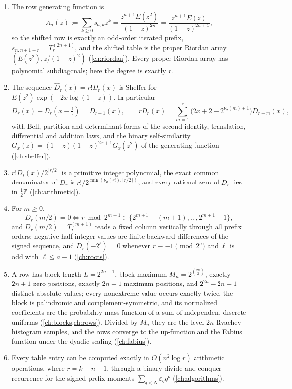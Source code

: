 \documentclass[11pt,a4paper,oneside,openany]{book}
\numberwithin{equation}{chapter}
\theoremstyle{definition}
\theoremstyle{remark}
\newcommand{\Z}{\mathbb Z}
\newcommand{\eps}{\varepsilon}
\newcommand{\nuTwo}{\nu_2}
\newcommand{\Diag}{D}
\newcommand{\Prefix}{T}
\begin{document}
\begin{enumerate}
\item The row generating function is
\[
 A_n(z):=\sum_{k\ge0}s_{n,k}z^k
 =\frac{z^{n+1}E(z^2)}{(1-z)^{2n}}
 =\frac{z^{n+1}E(z)}{(1-z)^{2n+1}},
\]
so the shifted row is exactly an odd-order iterated prefix,
$s_{n,n+1+r}=\Prefix_r^{(2n+1)}$, and the shifted table is the proper Riordan
array $(E(z^2),z/(1-z)^2)$ (\cref{ch:riordan}). Every proper Riordan array
has polynomial subdiagonals; here the degree is exactly $r$.

\item The sequence $\widehat\Diag_r(x)=r!\Diag_r(x)$ is Sheffer for
$E(z^2)\exp(-2x\log(1-z))$. In particular
\[
 \Diag_r(x)-\Diag_r(x-\tfrac12)=\Diag_{r-1}(x),
 \qquad
 r\Diag_r(x)=\sum_{m=1}^r\bigl(2x+2-2^{\nuTwo(m)+1}\bigr)\Diag_{r-m}(x),
\]
with Bell, partition and determinant forms of the second identity,
translation, differential and addition laws, and the binary self-similarity
$G_x(z)=(1-z)(1+z)^{2x+1}G_x(z^2)$ of the generating function
(\cref{ch:sheffer}).

\item $r!\Diag_r(x)/2^{\lceil r/2\rceil}$ is a primitive integer polynomial,
the exact common denominator of $\Diag_r$ is
$r!/2^{\min(\nuTwo(r!),\lceil r/2\rceil)}$, and every rational zero of
$\Diag_r$ lies in $\tfrac12\Z$ (\cref{ch:arithmetic}).

\item For $m\ge0$,
\[
 \Diag_r(m/2)=0
 \iff
 r\bmod 2^{m+1}\in\{2^{m+1}-(m+1),\ldots,2^{m+1}-1\},
\]
and $\Diag_r(m/2)=\Prefix_r^{(m+1)}$ reads a fixed column vertically through
all prefix orders; negative half-integer values are finite backward
differences of the signed sequence, and $\Diag_r(-2^\ell)=0$ whenever
$r\equiv-1\pmod{2^a}$ and $\ell$ is odd with $\ell\le a-1$
(\cref{ch:roots}).

\item A row has block length $L=2^{2n+1}$, block maximum
$M_n=2^{\binom{2n}{2}}$, exactly $2n+1$ zero positions, exactly $2n+1$
maximum positions, and $2^{2n}-2n+1$ distinct absolute values; every
nonextreme value occurs exactly twice, the block is palindromic and
complement-symmetric, and its normalized coefficients are the probability
mass function of a sum of independent discrete uniforms
(\cref{ch:blocks,ch:rows}). Divided by $M_n$ they are the level-$2n$ Rvachev
histogram samples, and the rows converge to the up-function and the Fabius
function under the dyadic scaling (\cref{ch:fabius}).

\item Every table entry can be computed exactly in $O(n^2\log r)$ arithmetic
operations, where $r=k-n-1$, through a binary divide-and-conquer recurrence
for the signed prefix moments $\sum_{q<N}\eps_qq^d$ (\cref{ch:algorithms}).
\end{enumerate}
\end{document}
